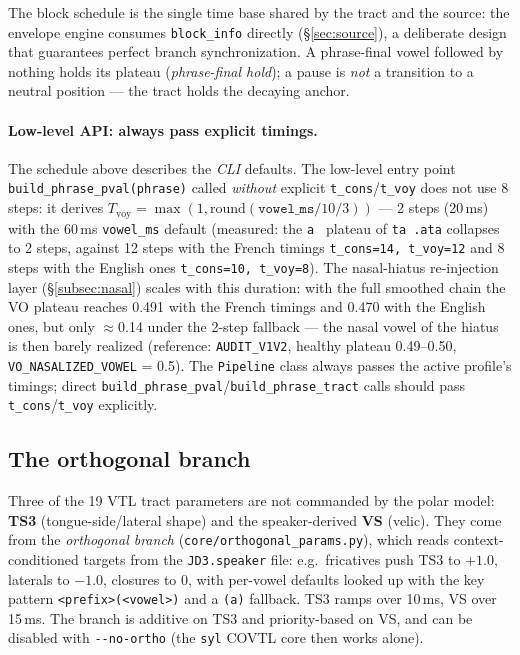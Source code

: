 \documentclass[11pt,a4paper]{article}
\begin{document}
The block schedule is the single time base shared by the tract and the
source: the envelope engine consumes \texttt{block\_info} directly
(\S\ref{sec:source}), a deliberate design that guarantees perfect branch
synchronization. A phrase-final vowel followed by nothing holds its
plateau (\emph{phrase-final hold}); a pause is \emph{not} a transition to
a neutral position --- the tract holds the decaying anchor.

\paragraph{Low-level API: always pass explicit timings.} The schedule
above describes the \emph{CLI} defaults. The low-level entry point
\texttt{build\_phrase\_pval(phrase)} called \emph{without} explicit
\texttt{t\_cons}/\texttt{t\_voy} does not use 8 steps: it derives
\(T_{\mathrm{voy}} = \max(1, \mathrm{round}(\texttt{vowel\_ms}/10/3))\)
--- 2 steps (20\,ms) with the 60\,ms \texttt{vowel\_ms} default
(measured: the \texttt{a~} plateau of \texttt{ta~.ata} collapses to
2 steps, against 12 steps with the French timings
\texttt{t\_cons=14, t\_voy=12} and 8 steps with the English ones
\texttt{t\_cons=10, t\_voy=8}). The nasal-hiatus re-injection layer
(\S\ref{subsec:nasal}) scales with this duration: with the full
smoothed chain the VO plateau reaches 0.491 with the French timings and
0.470 with the English ones, but only $\approx$0.14 under the 2-step
fallback --- the nasal vowel of the hiatus is then barely realized
(reference: \texttt{AUDIT\_V1V2}, healthy plateau 0.49--0.50,
\texttt{VO\_NASALIZED\_VOWEL} = 0.5). The \texttt{Pipeline} class
always passes the active profile's timings; direct
\texttt{build\_phrase\_pval}/\texttt{build\_phrase\_tract} calls
should pass \texttt{t\_cons}/\texttt{t\_voy} explicitly.

\subsection{The orthogonal branch}\label{sec:ortho}

Three of the 19 VTL tract parameters are not commanded by the polar
model: \textbf{TS3} (tongue-side/lateral shape) and the speaker-derived
\textbf{VS} (velic). They come from the \emph{orthogonal branch}
(\texttt{core/orthogonal\_params.py}), which reads context-conditioned
targets from the \texttt{JD3.speaker} file: e.g.\ fricatives push
TS3 to \(+1.0\), laterals to \(-1.0\), closures to 0, with per-vowel
defaults looked up with the key pattern \texttt{<prefix>(<vowel>)} and a
\texttt{(a)} fallback. TS3 ramps over 10\,ms, VS over 15\,ms. The branch
is additive on TS3 and priority-based on VS, and can be disabled with
\texttt{-{}-no-ortho} (the \texttt{syl} COVTL core then works alone).
\end{document}
